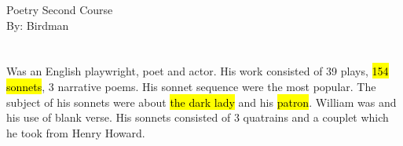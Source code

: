 \documentclass[12pt, a4paper]{article}
\begin{document}
\begin{center}
\huge{Poetry Second Course}\\[0.5cm]
\Large{By: Birdman}\\[1cm]
\end{center}

\section*{}
{\fontpar
Was an English playwright, poet and actor. His work consisted
of 39 plays, \hl{154 sonnets}, 3 narrative poems. His sonnet sequence were
the most popular. The subject of his sonnets were about \hl{the dark lady} and his \hl{patron}.
William was  and his use of blank verse. His 
sonnets consisted of 3 quatrains and a couplet which he 
took from Henry Howard.
}
\end{document}
